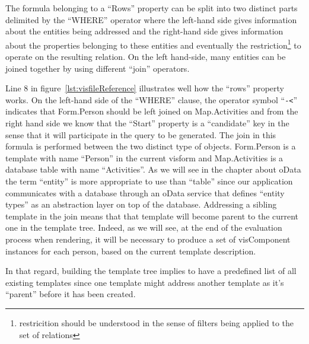 The formula belonging to a ``Rows'' property can be split into two distinct parts delimited by the ``WHERE'' operator where the left-hand side gives information about the entities being addressed and the right-hand side gives information about the properties belonging to these entities and eventually the restriction\footnote{restricition should be understood in the sense of filters being applied to the set of relations} to operate on the resulting relation. On the left hand-side, many entities can be joined together by using different ``join'' operators.

Line 8 in figure~\ref{lst:visfileReference} illustrates well how the ``rows'' property works. On the left-hand side of the ``WHERE'' clause, the operator symbol ``\texttt{-<}'' indicates that Form.Person should be left joined on Map.Activities and from the right hand side we know that the ``Start'' property is a ``candidate'' key in the sense that it will participate in the query to be generated. The join in this formula is performed between the two distinct type of objects. Form.Person is a template with name ``Person'' in the current visform and Map.Activities is a database table with name ``Activities''. As we will see in the chapter about oData the term ``entity'' is more appropriate to use than ``table'' since our application communicates with a database through an oData service that defines ``entity types'' as an abstraction layer on top of the database. Addressing a sibling template in the join means that that template will become parent to the current one in the template tree. Indeed, as we will see, at the end of the evaluation process when rendering, it will be necessary to produce a set of visComponent instances for each person, based on the current template description.

In that regard, building the template tree implies to have a predefined list of all existing templates since one template might address another template as it's ``parent'' before it has been created.

